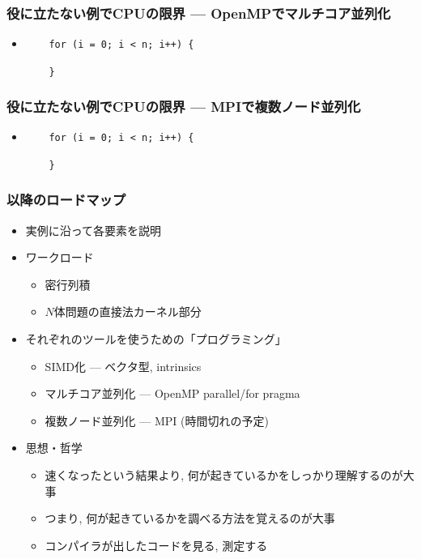 \documentclass[10pt,dvipdfmx]{beamer}
\newcommand{\ao}[1]{{\color{blue}#1}}
\begin{document}
\begin{frame}[fragile]
\frametitle{役に立たない例でCPUの限界 ---  OpenMPでマルチコア並列化}
\begin{itemize}
\item []
  \begin{lstlisting}
    for (i = 0; i < n; i++) {
      
    }
  \end{lstlisting}
\end{itemize}
\end{frame}

\begin{frame}[fragile]
\frametitle{役に立たない例でCPUの限界 --- MPIで複数ノード並列化}
\begin{itemize}
\item []
  \begin{lstlisting}
    for (i = 0; i < n; i++) {
      
    }
  \end{lstlisting}
\end{itemize}
\end{frame}
\fi

\begin{frame}
  \frametitle{以降のロードマップ}
  \begin{itemize}
  \item 実例に沿って各要素を説明
  \item ワークロード
    \begin{itemize}
    \item 密行列積
    \item $N$体問題の直接法カーネル部分
    \end{itemize}
  \item それぞれのツールを使うための「プログラミング」
    \begin{itemize}
    \item \ao{SIMD化} --- ベクタ型, intrinsics
    \item \ao{マルチコア並列化} --- OpenMP parallel/for pragma
    \item \ao{複数ノード並列化} --- MPI (時間切れの予定)
    \end{itemize}
  \item 思想・哲学
    \begin{itemize}
    \item 速くなったという結果より,
      何が起きているかをしっかり理解するのが大事
    \item つまり,
      何が起きているかを調べる方法を覚えるのが大事
    \item コンパイラが出したコードを見る, 測定する
    \end{itemize}
  \end{itemize}
\end{frame}
\end{document}
